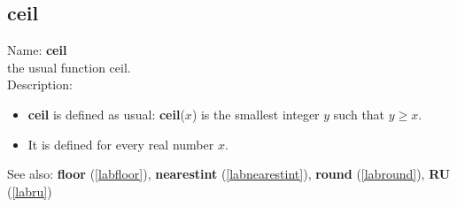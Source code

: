 \subsection{ceil}
\label{labceil}
\noindent Name: \textbf{ceil}\\
the usual function ceil.\\
\noindent Description: \begin{itemize}

\item \textbf{ceil} is defined as usual: \textbf{ceil}($x$) is the smallest integer $y$ such that $y \ge x$.

\item It is defined for every real number $x$.
\end{itemize}
See also: \textbf{floor} (\ref{labfloor}), \textbf{nearestint} (\ref{labnearestint}), \textbf{round} (\ref{labround}), \textbf{RU} (\ref{labru})
